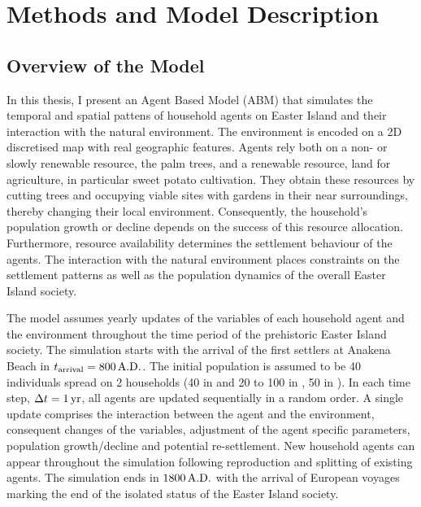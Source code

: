 \chapter{Methods and Model Description}

\section{Overview of the Model}
In this thesis, I present an Agent Based Model (ABM) that simulates the temporal and spatial pattens of household agents on Easter Island and their interaction with the natural environment. 
The environment is encoded on a 2D discretised map with real geographic features.
Agents rely both on a non- or slowly renewable resource, the palm trees, and a renewable resource, land for agriculture, in particular sweet potato cultivation. 
They obtain these resources by cutting trees and occupying viable sites with gardens in their near surroundings, thereby changing their local environment.
Consequently, the household's population growth or decline depends on the success of this resource allocation. 
Furthermore, resource availability determines the settlement behaviour of the agents.
The interaction with the natural environment places constraints on the settlement patterns as well as the population dynamics of the overall Easter Island society.

The model assumes yearly updates of the variables of each household agent and the environment throughout the time period of the prehistoric Easter Island society.
The simulation starts with the arrival of the first settlers at Anakena Beach in $t_\text{arrival} = 800\, {\rm A.D.}$. 
The initial population is assumed to be 40 individuals spread on 2 households (40 in \citet{Good2006} and 20 to 100 in \citet{Brander1998}, 50 in \citet{Brandt2015}).
In each time step, $\Delta t=1\,{\rm yr}$, all agents are updated sequentially in a random order. 
A single update comprises the interaction between the agent and the environment, consequent changes of the variables, adjustment of the agent specific parameters, population growth/decline and potential re-settlement.
New household agents can appear throughout the simulation following reproduction and splitting of existing agents. 
The simulation ends in $1800\, {\rm A.D.}$ with the arrival of European voyages marking the end of the isolated status of the Easter Island society.%

